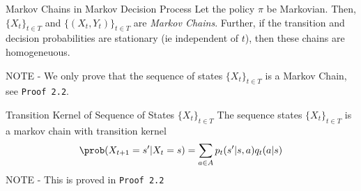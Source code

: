\documentclass[11pt,a4paper]{article}
\begin{document}
  \begin{theorem}{Markov Chains in Markov Decision Process}
    Let the policy $\pi$ be Markovian. Then, $\{X_t\}_{t\in T}$ and $\{(X_t,Y_t)\}_{t\in T}$ are \textit{Markov Chains}. Further, if the transition and decision probabilities are stationary (ie independent of $t$), then these chains are homogeneuous.
    \par NOTE - We only prove that the sequence of states $\{X_t\}_{t\in T}$ is a Markov Chain, see \texttt{Proof 2.2}.
  \end{theorem}

  \begin{theorem}{Transition Kernel of Sequence of States $\{X_t\}_{t\in T}$}
    The sequence states $\{X_t\}_{t\in T}$ is a markov chain with transition kernel
    \[ \prob(X_{t+1}=s'|X_t=s)=\sum_{a\in A}p_t(s'|s,a)q_t(a|s) \]
    NOTE - This is proved in \texttt{Proof 2.2}
  \end{theorem}
\end{document}

